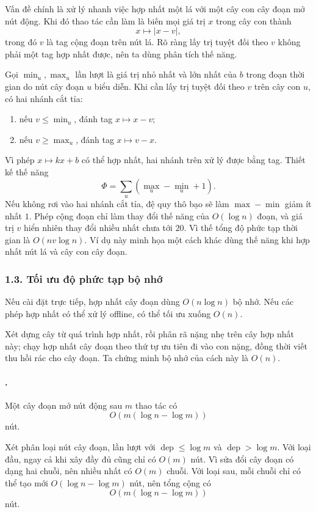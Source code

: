 \documentclass[11pt]{article}
\begin{document}
Vấn đề chính là xử lý nhanh việc hợp nhất một lá với một cây con cây đoạn mở
nút động. Khi đó thao tác cần làm là biến mọi giá trị \(x\) trong cây con thành
\[
  x\mapsto |x-v|,
\]
trong đó \(v\) là tag cộng đoạn trên nút lá. Rõ ràng lấy trị tuyệt đối theo
\(v\) không phải một tag hợp nhất được, nên ta dùng phân tích thế năng.

Gọi \(\min_u,\max_u\) lần lượt là giá trị nhỏ nhất và lớn nhất của \(b\) trong
đoạn thời gian do nút cây đoạn \(u\) biểu diễn. Khi cần lấy trị tuyệt đối theo
\(v\) trên cây con \(u\), có hai nhánh cắt tỉa:
\begin{enumerate}
  \item nếu \(v\le \min_u\), đánh tag \(x\mapsto x-v\);
  \item nếu \(v\ge \max_u\), đánh tag \(x\mapsto v-x\).
\end{enumerate}

Vì phép \(x\mapsto kx+b\) có thể hợp nhất, hai nhánh trên xử lý được bằng tag.
Thiết kế thế năng
\[
  \Phi=\sum_u (\max_u-\min_u+1).
\]
Nếu không rơi vào hai nhánh cắt tỉa, đệ quy thô bạo sẽ làm \(\max-\min\) giảm
ít nhất \(1\). Phép cộng đoạn chỉ làm thay đổi thế năng của \(O(\log n)\) đoạn,
và giá trị \(v\) hiển nhiên thay đổi nhiều nhất chưa tới \(20\). Vì thế tổng độ
phức tạp thời gian là \(O(nv\log n)\). Ví dụ này minh họa một cách khác dùng
thế năng khi hợp nhất nút lá và cây con cây đoạn.

\subsubsection*{1.3. Tối ưu độ phức tạp bộ nhớ}

Nếu cài đặt trực tiếp, hợp nhất cây đoạn dùng \(O(n\log n)\) bộ nhớ. Nếu các
phép hợp nhất có thể xử lý offline, có thể tối ưu xuống \(O(n)\).

Xét dựng cây từ quá trình hợp nhất, rồi phân rã nặng nhẹ trên cây hợp nhất này;
chạy hợp nhất cây đoạn theo thứ tự ưu tiên đi vào con nặng, đồng thời viết thu
hồi rác cho cây đoạn. Ta chứng minh bộ nhớ của cách này là \(O(n)\).

\paragraph{.}
Một cây đoạn mở nút động sau \(m\) thao tác có
\[
  O(m(\log n-\log m))
\]
nút.

Xét phân loại nút cây đoạn, lần lượt với \(\operatorname{dep}\le \log m\) và
\(\operatorname{dep}>\log m\). Với loại đầu, ngay cả khi xây đầy đủ cũng chỉ có
\(O(m)\) nút. Vì sửa đổi cây đoạn có dạng hai chuỗi, nên nhiều nhất có
\(O(m)\) chuỗi. Với loại sau, mỗi chuỗi chỉ có thể tạo mới
\(O(\log n-\log m)\) nút, nên tổng cộng có
\[
  O(m(\log n-\log m))
\]
nút.
\end{document}
